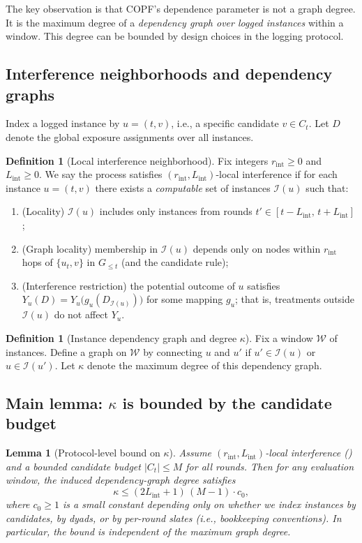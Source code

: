 \documentclass[11pt]{article}
\newcommand{\1}{\mathbf{1}}
\newcommand{\cW}{\mathcal{W}}
\newcommand{\cI}{\mathcal{I}}
\theoremstyle{plain}
\newtheorem{lemma}[theorem]{Lemma}
\theoremstyle{definition}
\newtheorem{definition}[theorem]{Definition}
\theoremstyle{remark}
\begin{document}
The key observation is that COPF's dependence parameter is not a graph degree.
It is the maximum degree of a \emph{dependency graph over logged instances} within a window.
This degree can be bounded by design choices in the logging protocol.

\subsection{Interference neighborhoods and dependency graphs}
Index a logged instance by $u=(t,v)$, i.e., a specific candidate $v\in C_t$.
Let $D$ denote the global exposure assignments over all instances.

\begin{definition}[Local interference neighborhood]\label{def:localint}
Fix integers $r_{\mathrm{int}}\ge 0$ and $L_{\mathrm{int}}\ge 0$.
We say the process satisfies $(r_{\mathrm{int}},L_{\mathrm{int}})$-local interference if
for each instance $u=(t,v)$ there exists a \emph{computable} set of instances $\cI(u)$ such that:
\begin{enumerate}[leftmargin=2em]
\item (Locality) $\cI(u)$ includes only instances from rounds $t'\in[t-L_{\mathrm{int}},\,t+L_{\mathrm{int}}]$;
\item (Graph locality) membership in $\cI(u)$ depends only on nodes within $r_{\mathrm{int}}$ hops of $\{u_t,v\}$ in $G_{\le t}$
(and the candidate rule);
\item (Interference restriction) the potential outcome of $u$ satisfies
$Y_u(D)=Y_u\bigl(g_u(D_{\cI(u)})\bigr)$ for some mapping $g_u$;
that is, treatments outside $\cI(u)$ do not affect $Y_u$.
\end{enumerate}
\end{definition}

\begin{definition}[Instance dependency graph and degree $\kappa$]\label{def:depgraph}
Fix a window $\cW$ of instances.
Define a graph on $\cW$ by connecting $u$ and $u'$ if $u'\in\cI(u)$ or $u\in\cI(u')$.
Let $\kappa$ denote the maximum degree of this dependency graph.
\end{definition}

\subsection{Main lemma: $\kappa$ is bounded by the candidate budget}
\begin{lemma}[Protocol-level bound on $\kappa$]\label{lem:kappa}
Assume $(r_{\mathrm{int}},L_{\mathrm{int}})$-local interference ()
and a bounded candidate budget $|C_t|\le M$ for all rounds.
Then for any evaluation window, the induced dependency-graph degree satisfies
\[
\kappa \le (2L_{\mathrm{int}}+1)\,(M-1)\cdot c_0,
\]
where $c_0\ge 1$ is a small constant depending only on whether we index instances by candidates,
by dyads, or by per-round slates (i.e., bookkeeping conventions).
In particular, the bound is \emph{independent} of the maximum graph degree.
\end{lemma}
\end{document}
